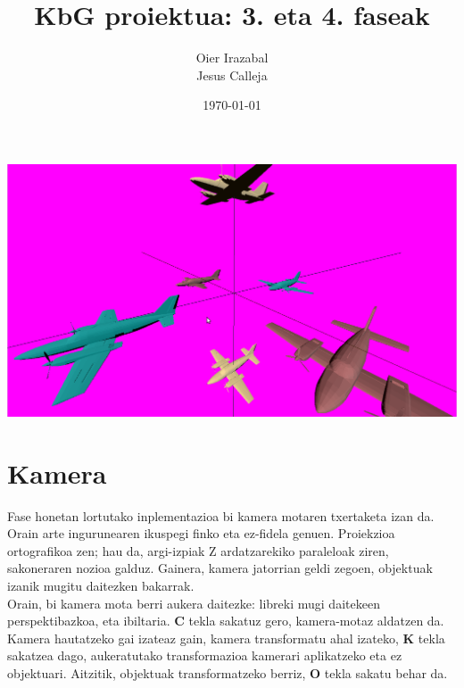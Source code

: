 \documentclass[12pt]{article}
\title{KbG proiektua: 3. eta 4. faseak}
\author{
        Oier Irazabal\\
        Jesus Calleja
}
\date{\today}
\newcommand{\tekla}[1] {\textbf{#1}}
\begin{document}
\maketitle


\tableofcontents

\vspace{0.7cm}
\begin{center}
\includegraphics[scale=0.24]{fase_34_portada.png}\\
\end{center}

\pagebreak

\section{Kamera}

Fase honetan lortutako inplementazioa bi kamera motaren txertaketa izan da. Orain arte ingurunearen ikuspegi finko eta ez-fidela genuen. Proiekzioa ortografikoa zen; hau da, argi-izpiak Z ardatzarekiko paraleloak ziren, sakoneraren nozioa galduz. Gainera, kamera jatorrian geldi zegoen, objektuak izanik mugitu daitezken bakarrak.\\

Orain, bi kamera mota berri aukera daitezke: libreki mugi daitekeen perspektibazkoa, eta ibiltaria. \tekla{C} tekla sakatuz gero, kamera-motaz aldatzen da. Kamera hautatzeko gai izateaz gain, kamera transformatu ahal izateko, \tekla{K} tekla sakatzea dago, aukeratutako transformazioa kamerari aplikatzeko eta ez objektuari. Aitzitik, objektuak transformatzeko berriz, \tekla{O} tekla sakatu behar da.\\
\end{document}
